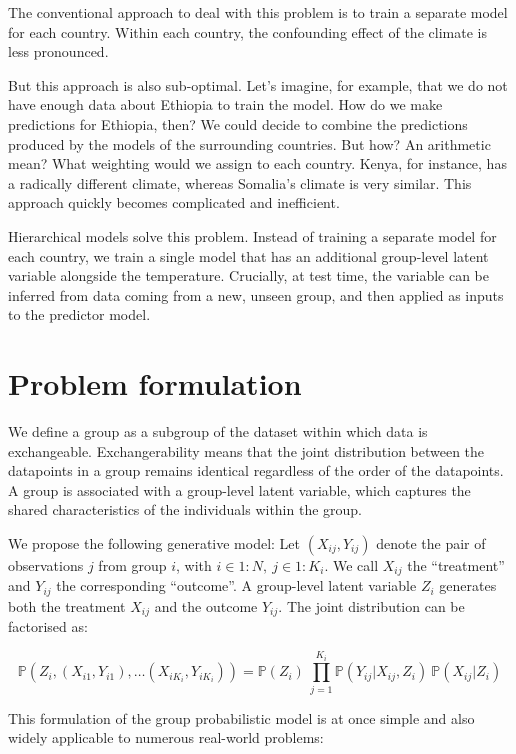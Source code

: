 \documentclass[backrefs]{cam-thesis}
\begin{document}
The conventional approach to deal with this problem is to train a separate model for each country. Within each country, the confounding effect of the climate is less pronounced.

But this approach is also sub-optimal. Let's imagine, for example, that we do not have enough data about Ethiopia to train the model. How do we make predictions for Ethiopia, then? We could decide to combine the predictions produced by the models of the surrounding countries. But how? An arithmetic mean? What weighting would we assign to each country. Kenya, for instance, has a radically different climate, whereas Somalia's climate is very similar. This approach quickly becomes complicated and inefficient.

Hierarchical models solve this problem. Instead of training a separate model for each country, we train a single model that has an additional group-level latent variable alongside the temperature. Crucially, at test time, the variable can be inferred from data coming from a new, unseen group, and then applied as inputs to the predictor model.

\section{Problem formulation}

We define a group as a subgroup of the dataset within which data is exchangeable. Exchangerability means that the joint distribution between the datapoints in a group remains identical regardless of the order of the datapoints. A group is associated with a group-level latent variable, which captures the shared characteristics of the individuals within the group.

We propose the following generative model: Let $(X_{ij}, Y_{ij})$ denote the pair of observations $j$ from group $i$, with $i \in 1:N, ~ j \in 1:K_i$. We call $X_{ij}$ the ``treatment'' and $Y_{ij}$ the corresponding ``outcome''. A group-level latent variable $Z_i$ generates both the treatment $X_{ij}$ and the outcome $Y_{ij}$. The joint distribution can be factorised as: 

\begin{equation}
    \mathbb{P} (Z_i, (X_{i1}, Y_{i1}), \dots (X_{iK_i}, Y_{iK_i})) = \mathbb{P} (Z_i) ~ \prod_{j=1}^{ K_i} \mathbb{P} (Y_{ij} | X_{ij}, Z_i) ~ \mathbb{P} (X_{ij} | Z_i)
\end{equation}

This formulation of the group probabilistic model is at once simple and also widely applicable to numerous real-world problems:
\end{document}
